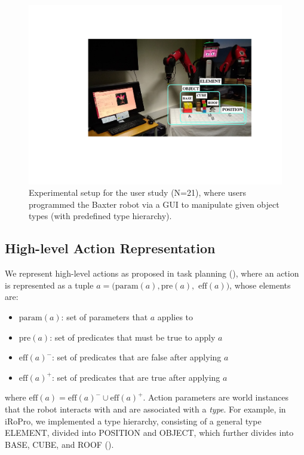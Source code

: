 
\begin{figure}[h]
	\centering
	\includegraphics[width=0.7\linewidth]{figures/dispositif.pdf}
	\caption{Experimental setup for the user study (N=21), where users programmed the Baxter robot via a GUI to manipulate given object types (with predefined type hierarchy). }
	\label{fig:dispositif}
\end{figure}


\subsection{High-level Action Representation}
\label{sec:highlevel}
We represent high-level actions as proposed in task planning (), where an action is represented as a tuple $a = (\text{param}(a), \text{pre}(a),$ $\text{eff}(a))$, whose elements are:
\begin{itemize}
\item $\text{param}(a)$: set of parameters that $a$ applies to
\item $\text{pre}(a)$: set of predicates that must be true to apply $a$
\item $\text{eff}(a)^{-}$: set of predicates that are false after applying $a$
\item $\text{eff}(a)^{+}$: set of predicates that are true after applying $a$
\end{itemize}
where $\text{eff}(a) = \text{eff}(a)^{-} \cup \text{eff}(a)^{+}$. 
Action parameters are world instances that the robot interacts with and are associated with a \textit{type}.
For example, in iRoPro, we implemented a type hierarchy, consisting of a general type ELEMENT, divided into POSITION and OBJECT, which further divides into BASE, CUBE, and ROOF ().

